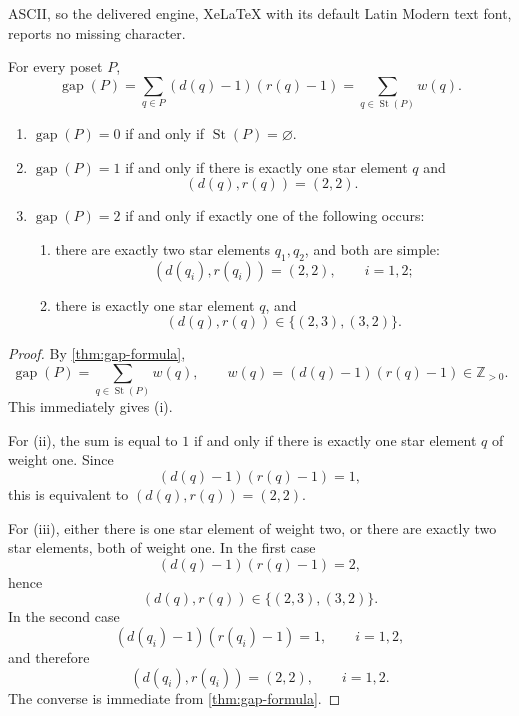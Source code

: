 \documentclass[10pt,a4paper]{amsart}
\newcommand{\St}{\operatorname{St}}
\newcommand{\gap}{\operatorname{gap}}
\begin{document}
ASCII, so the delivered engine, XeLaTeX with its default Latin Modern text font, reports no missing character.
\begin{theorem}\label{thm:gap-formula}
For every poset $P$,
\begin{equation}\label{eq:gap-formula}
  \gap(P)=\sum_{q\in P}(d(q)-1)(r(q)-1)
  =\sum_{q\in\St(P)}w(q).
\end{equation}
\end{theorem}

\begin{corollary}\label{cor:smallgap}
\begin{enumerate}[label=\textup{(\roman*)}]
  \item $\gap(P)=0$ if and only if $\St(P)=\varnothing$.
  \item $\gap(P)=1$ if and only if there is exactly one star element $q$ and
  \[
     (d(q),r(q))=(2,2).
  \]
  \item $\gap(P)=2$ if and only if exactly one of the following occurs:
  \begin{enumerate}[label=\textup{(\alph*)}]
    \item there are exactly two star elements $q_1,q_2$, and both are simple:
    \[
       (d(q_i),r(q_i))=(2,2),\qquad i=1,2;
    \]
    \item there is exactly one star element $q$, and
    \[
       (d(q),r(q))\in\{(2,3),(3,2)\}.
    \]
  \end{enumerate}
\end{enumerate}
\end{corollary}

\begin{proof}
By \cref{thm:gap-formula},
\[
  \gap(P)=\sum_{q\in\St(P)} w(q),
  \qquad
  w(q)=(d(q)-1)(r(q)-1)\in\mathbb Z_{>0}.
\]
This immediately gives (i).

For (ii), the sum is equal to $1$ if and only if there is exactly one
star element $q$ of weight one. Since
\[
  (d(q)-1)(r(q)-1)=1,
\]
this is equivalent to $(d(q),r(q))=(2,2)$.

For (iii), either there is one star element of weight two, or there are
exactly two star elements, both of weight one. In the first case
\[
  (d(q)-1)(r(q)-1)=2,
\]
hence
\[
  (d(q),r(q))\in\{(2,3),(3,2)\}.
\]
In the second case
\[
  (d(q_i)-1)(r(q_i)-1)=1,\qquad i=1,2,
\]
and therefore
\[
  (d(q_i),r(q_i))=(2,2),\qquad i=1,2.
\]
The converse is immediate from \cref{thm:gap-formula}.
\end{proof}
\end{document}
